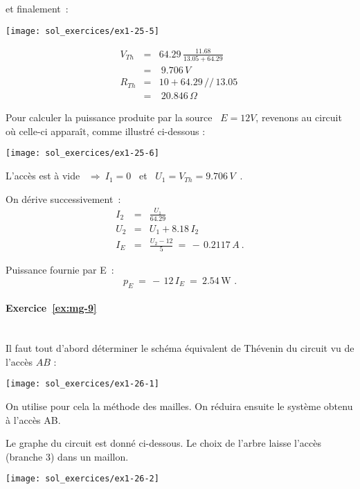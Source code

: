 et finalement~:

\parbox[c]{6cm}{\begin{center}
\texttt{[image: sol\_exercices/ex1-25-5]}
\end{center}}
\parbox[c]{4cm}{
\begin{eqnarray*}
	V_{Th} &=& 64.29 \, \frac{11.68}{13.05 + 64.29} \: \\&= &\: 9.706\, V \\
	R_{Th} &=& 10 + 64.29\, // \, 13.05 \:\\& =& \: 20.846\, \Omega 
\end{eqnarray*}}

Pour calculer la puissance produite par  la source \ $E=12V$,
revenons au circuit où celle-ci apparaît,  comme illustré ci-dessous : 
\begin{center}
	\texttt{[image: sol\_exercices/ex1-25-6]}
\end{center}

L'accès est à vide \ $\Rightarrow \: I_1 = 0$ \ et \ $U_1 = V_{Th} =
9.706\, V$~.

On dérive successivement~:
\begin{eqnarray*} 
	I_2 &=& \frac{U_1}{64.29} \\
	U_2 &=& U_1 + 8.18\, I_2 \\
	I_E &=& \frac{U_2 -12}{5} \: = \, -\, 0.2117\, A~.
\end{eqnarray*}

Puissance fournie par E~:
\[ p_E \: = \,-\, 12\, I_E \: = \: 2.54\, \text{W~.} \] 



\paragraph{Exercice~\ref{ex:mg-9}}~\\%
Il faut tout d'abord déterminer le schéma équivalent de Thévenin du
circuit vu de l'accès $AB$ :
\begin{center}
	\texttt{[image: sol\_exercices/ex1-26-1]}
\end{center}

On utilise pour cela la méthode des mailles. On réduira ensuite le
système obtenu à l'accès AB.

Le graphe du circuit est donné ci-dessous. Le choix de l'arbre laisse l'accès (branche 3)
dans un maillon.
\begin{center}
	\texttt{[image: sol\_exercices/ex1-26-2]}
\end{center}

